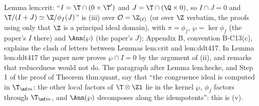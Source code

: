 \begin{paperlink}\label{pl:modules:congruence-ideal}
Lemma lem:crit: ``$I=\T\cap(0\times\T')$ and $J=\T\cap(\Q\times0)$, so $I\cap J=0$ and $\T/(I+J)\simeq\Z/\phi_f(J)$'' is (iii) over $\mathcal O=\Z_{(\ell)}$
(or over $\Z$ verbatim, the proofs using only that $\Z$ is a principal ideal domain), with $\pi=\phi_f$, $\wp=\ker\phi_f$ (the paper's $I$ there) and $\Ann(\wp)$ (the paper's
$J$); Appendix B, convention B-C13(c), explains the clash of letters between Lemmas lem:crit and lem:ddt417. In Lemma lem:ddt417 the paper now proves $\wp\cap I=0$ by
the argument of (ii), and remarks that reducedness would not do. The paragraph after Lemma lem:hecke, and Step 1 of the proof of Theorem thm:quant, say that
``the congruence ideal is computed in $\T_{\mf m}$: the other local factors of $\T\otimes\Zl$ lie in the kernel $\wp$, $\phi_f$ factors through $\T_{\mf m}$, and $\Ann(\wp)$
decomposes along the idempotents'': this is (v).
\end{paperlink}

